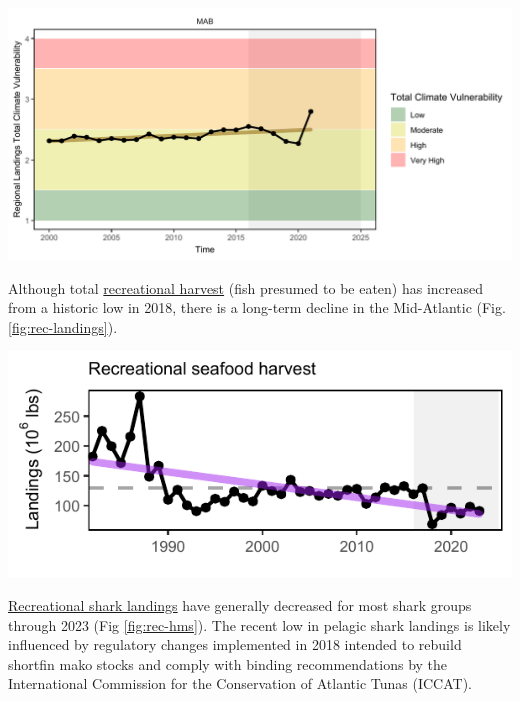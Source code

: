\documentclass[
  10pt,
]{article}
\let\origfigure\figure
\let\endorigfigure\endfigure
\renewenvironment{figure}[1][2] {
    \expandafter\origfigure\expandafter[H]
} {
    \endorigfigure
}
\begin{document}
\begin{figure}

{\centering \includegraphics{midatlantic_files/figure-latex/climatevul-land-1} 

}

\caption{Mid-Atlantic region total climate vulnerability of commercial landings (sum of Mid-Atlantic port landings weighted by species climate vulnerability from Hare et al. 2016).}\label{fig:climatevul-land}
\end{figure}

Although total \href{https://noaa-edab.github.io/catalog/recdat.html}{recreational harvest} (fish presumed to be eaten) has increased from a historic low in 2018, there is a long-term decline in the Mid-Atlantic (Fig. \ref{fig:rec-landings}).

\begin{figure}

{\centering \includegraphics{midatlantic_files/figure-latex/rec-landings-1} 

}

\caption{Total recreational seafood harvest (millions of pounds, black, significant decrease, purple) in the Mid-Atlantic region.}\label{fig:rec-landings}
\end{figure}

\href{https://noaa-edab.github.io/catalog/rec_hms.html}{Recreational shark landings} have generally decreased for most shark groups through 2023 (Fig \ref{fig:rec-hms}). The recent low in pelagic shark landings is likely influenced by regulatory changes implemented in 2018 intended to rebuild shortfin mako stocks and comply with binding recommendations by the International Commission for the Conservation of Atlantic Tunas (ICCAT).
\end{document}
